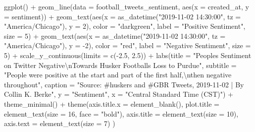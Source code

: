 \documentclass[
  letterpaper,
  DIV=11,
  numbers=noendperiod]{scrreprt}
\newenvironment{Shaded}{\begin{snugshade}}{\end{snugshade}}
\newcommand{\AttributeTok}[1]{\textcolor[rgb]{0.40,0.45,0.13}{#1}}
\newcommand{\DecValTok}[1]{\textcolor[rgb]{0.68,0.00,0.00}{#1}}
\newcommand{\FloatTok}[1]{\textcolor[rgb]{0.68,0.00,0.00}{#1}}
\newcommand{\FunctionTok}[1]{\textcolor[rgb]{0.28,0.35,0.67}{#1}}
\newcommand{\NormalTok}[1]{\textcolor[rgb]{0.00,0.23,0.31}{#1}}
\newcommand{\SpecialCharTok}[1]{\textcolor[rgb]{0.37,0.37,0.37}{#1}}
\newcommand{\StringTok}[1]{\textcolor[rgb]{0.13,0.47,0.30}{#1}}
\begin{document}
\begin{Shaded}
\begin{Highlighting}[]
\FunctionTok{ggplot}\NormalTok{() }\SpecialCharTok{+}
  \FunctionTok{geom\_line}\NormalTok{(}\AttributeTok{data =}\NormalTok{ football\_tweets\_sentiment, }\FunctionTok{aes}\NormalTok{(}\AttributeTok{x =}\NormalTok{ created\_at, }\AttributeTok{y =}\NormalTok{ sentiment)) }\SpecialCharTok{+}
  \FunctionTok{geom\_text}\NormalTok{(}\FunctionTok{aes}\NormalTok{(}\AttributeTok{x =} \FunctionTok{as\_datetime}\NormalTok{(}\StringTok{"2019{-}11{-}02 14:30:00"}\NormalTok{, }\AttributeTok{tz =} \StringTok{"America/Chicago"}\NormalTok{), }\AttributeTok{y =} \DecValTok{2}\NormalTok{), }\AttributeTok{color =} \StringTok{"darkgreen"}\NormalTok{, }\AttributeTok{label =} \StringTok{"Positive Sentiment"}\NormalTok{, }\AttributeTok{size =} \DecValTok{5}\NormalTok{) }\SpecialCharTok{+}
  \FunctionTok{geom\_text}\NormalTok{(}\FunctionTok{aes}\NormalTok{(}\AttributeTok{x =} \FunctionTok{as\_datetime}\NormalTok{(}\StringTok{"2019{-}11{-}02 14:30:00"}\NormalTok{, }\AttributeTok{tz =} \StringTok{"America/Chicago"}\NormalTok{), }\AttributeTok{y =} \SpecialCharTok{{-}}\DecValTok{2}\NormalTok{), }\AttributeTok{color =} \StringTok{"red"}\NormalTok{, }\AttributeTok{label =} \StringTok{"Negative Sentiment"}\NormalTok{, }\AttributeTok{size =} \DecValTok{5}\NormalTok{) }\SpecialCharTok{+}
  \FunctionTok{scale\_y\_continuous}\NormalTok{(}\AttributeTok{limits =} \FunctionTok{c}\NormalTok{(}\SpecialCharTok{{-}}\FloatTok{2.5}\NormalTok{, }\FloatTok{2.5}\NormalTok{)) }\SpecialCharTok{+}
  \FunctionTok{labs}\NormalTok{(}\AttributeTok{title =} \StringTok{"People\textquotesingle{}s Sentiment on Twitter Negative}\SpecialCharTok{\textbackslash{}n}\StringTok{Towards Husker Football\textquotesingle{}s Loss to Purdue"}\NormalTok{,}
       \AttributeTok{subtitle =} \StringTok{"People were positive at the start and part of the first half,}\SpecialCharTok{\textbackslash{}n}\StringTok{then negative throughout"}\NormalTok{,}
       \AttributeTok{caption =} \StringTok{"Source: \#huskers and \#GBR Tweets, 2019{-}11{-}02 | By Collin K. Berke"}\NormalTok{,}
       \AttributeTok{y =} \StringTok{"Sentiment"}\NormalTok{,}
       \AttributeTok{x =} \StringTok{"Central Standard Time (CST)"}\NormalTok{) }\SpecialCharTok{+} 
  \FunctionTok{theme\_minimal}\NormalTok{() }\SpecialCharTok{+}
  \FunctionTok{theme}\NormalTok{(}\AttributeTok{axis.title.x =} \FunctionTok{element\_blank}\NormalTok{(),}
        \AttributeTok{plot.title =} \FunctionTok{element\_text}\NormalTok{(}\AttributeTok{size =} \DecValTok{16}\NormalTok{, }\AttributeTok{face =} \StringTok{"bold"}\NormalTok{),}
    \AttributeTok{axis.title =} \FunctionTok{element\_text}\NormalTok{(}\AttributeTok{size =} \DecValTok{10}\NormalTok{),}
    \AttributeTok{axis.text =} \FunctionTok{element\_text}\NormalTok{(}\AttributeTok{size =} \DecValTok{7}\NormalTok{)}
\NormalTok{  )}
\end{Highlighting}
\end{Shaded}
\end{document}
